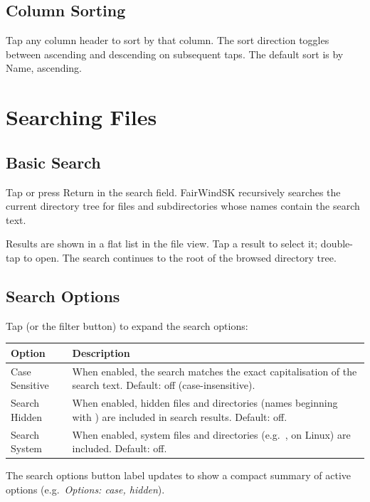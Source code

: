 \subsection{Column Sorting}

Tap any column header to sort by that column.
The sort direction toggles between ascending and descending on subsequent taps.
The default sort is by Name, ascending.

\section{Searching Files}

\subsection{Basic Search}

Tap  or press Return in the search field.
FairWindSK recursively searches the current directory tree for files and subdirectories whose names
contain the search text.

Results are shown in a flat list in the file view.
Tap a result to select it; double-tap to open.
The search continues to the root of the browsed directory tree.


\subsection{Search Options}

Tap  (or the filter button) to expand the search options:

\begin{longtable}{L{3.5cm} L{10.2cm}}
\toprule
{}
{\sffamily\bfseries\color{white} Option} &
{\sffamily\bfseries\color{white} Description} \\
\midrule
Case Sensitive & When enabled, the search matches the exact capitalisation of the search text. Default: off (case-insensitive). \\
Search Hidden & When enabled, hidden files and directories (names beginning with ) are included in search results. Default: off. \\
Search System & When enabled, system files and directories (e.g.\ ,  on Linux) are included. Default: off. \\
\bottomrule
\end{longtable}

The search options button label updates to show a compact summary of active options (e.g.\
\textit{Options: case, hidden}).

